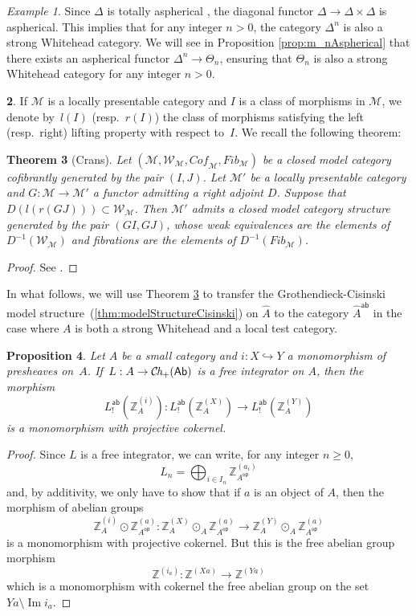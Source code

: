 \documentclass[10pt, english, a4paper, nothms]{amsart}
\theoremstyle{plain}
\newtheorem{theorem}{Theorem}[section]
\newtheorem{prop}[theorem]{Proposition}
\theoremstyle{remark}
\newtheorem{example}[theorem]{Example}
\theoremstyle{definition}
\newtheorem{paragr}[theorem]{}
\numberwithin{equation}{theorem}
\renewcommand\geq\geqslant
\newcommand\Z{\mathbb{Z}}
\newcommand{\Ch}{{\mathcal{C}\mspace{-2.mu}\it{h}_{+}}}
\DeclareMathOperator{\op}{\mathsf{op}}
\newcommand{\pref}[1]{{\widehat{ #1 }}}
\newcommand{\W}{\mathcal{W}}
\newcommand{\M}{\mathcal{M}}
\newcommand{\Ab}{{\mathsf{Ab}}}
\newcommand{\ab}{{\mathsf{ab}}}
\newcommand{\Wh}[2]{\Z_{#1}^{\left(#2\right)}}
\newcommand{\prefab}[1]{\widehat{ #1 }^{\mathsf{ab}}}
\DeclareMathOperator{\im}{Im}
\begin{document}
\begin{example}
\label{ex:WhiteheadCategories}
Since $\Delta$ is totally aspherical \cite[Proposition
1.6.14]{maltsiniotis2005}, the diagonal functor $\Delta \to \Delta\times\Delta$
is aspherical. This implies that for any integer $n > 0$, the category
$\Delta^n$ is also a strong Whitehead category. We will see in Proposition
\ref{prop:m_nAspherical} that there exists an aspherical functor
$\Delta^n \to \Theta_n$, ensuring that $\Theta_n$ is also a strong Whitehead
category for any integer $n>0$. \end{example}

\begin{paragr}
If $\M$ is a locally presentable category and $I$ is a class of
morphisms in $\M$, we denote by~$l(I)$ (resp.~$r(I)$) the class of
morphisms satisfying the left (resp.~right) lifting property with
respect to~$I$. We recall the following theorem:
\end{paragr}

\begin{theorem}[Crans]\label{th:CransTransfert}
Let $(\M, \W_\M, \textit{Cof}_\M,\textit{Fib}_\M)$ be a closed model
category cofibrantly generated by the pair $(I,J)$. Let $\M'$ be a
locally presentable category and $G: \M \to \M'$ a functor admitting
a right adjoint $D$. Suppose that 
$D(l(r(GJ)))\subset \W_\M$. 
Then $\M'$ admits a closed model category structure generated by the
pair $(GI,GJ)$, whose weak equivalences are the elements of
$D^{-1}(\W_\M)$ and fibrations are the elements of
$D^{-1}(\textit{Fib}_\M)$.
\end{theorem}
\begin{proof}
See \cite[Theorem 3.3]{Crans1995Quillen}.
\end{proof}

In what follows, we will use Theorem \ref{th:CransTransfert} to transfer the
Grothendieck-Cisinski model structure~(\ref{thm:modelStructureCisinski}) on
$\pref{A}$ to the category $\prefab{A}$ in the case where $A$ is both a strong
Whitehead and a local test category.

\begin{prop}\label{prop:intLibreMonos}
Let $A$ be a small category and $i: X \hookrightarrow Y$ a monomorphism of
presheaves on~$A$. If~$L: A \to \Ch(\Ab)$ is a free integrator on
$A$, then the morphism
\[
L_!^\ab ( \Wh{A}{i} ): L_!^\ab(\Wh{A}{X}) \to
L_!^\ab(\Wh{A}{Y})
\]
is a monomorphism with projective cokernel.
\end{prop}
\begin{proof}
Since $L$ is a free integrator, we can write, for any integer $n \geq
0$, 
\[
L_n = \bigoplus_{i\in I_n}\Wh{{A}^{\op}}{a_i} 
\]
and, by additivity, we only have to show that if $a$ is an object of
$A$, then the morphism of abelian groups
\[
\Wh{A}{i} \odot \Wh{{A}^{\op}}{a}: 
\Wh{A}{X} \odot_A \Wh{{A}^{\op}}{a} 
\to
\Wh{A}{Y} \odot_A \Wh{{A}^{\op}}{a}
\]
 is a monomorphism with projective cokernel. But this is the free
 abelian group morphism
\[
  \Z^{(i_a)}: \Z^{(Xa)}\to\Z^{(Ya)}
  \]
which is a monomorphism with cokernel the free abelian group on the set
$Ya\setminus \im i_a$.
\end{proof}
\end{document}

